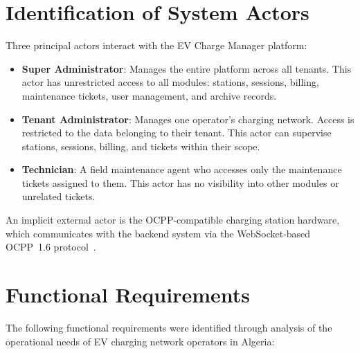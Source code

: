 \documentclass[12pt,a4paper]{report}
\begin{document}
\section{Identification of System Actors}

Three principal actors interact with the EV Charge Manager platform:

\begin{itemize}
  \item \textbf{Super Administrator}: Manages the entire platform across all tenants. This actor
        has unrestricted access to all modules: stations, sessions, billing, maintenance tickets,
        user management, and archive records.
  \item \textbf{Tenant Administrator}: Manages one operator's charging network. Access is
        restricted to the data belonging to their tenant. This actor can supervise stations,
        sessions, billing, and tickets within their scope.
  \item \textbf{Technician}: A field maintenance agent who accesses only the maintenance tickets
        assigned to them. This actor has no visibility into other modules or unrelated tickets.
\end{itemize}

An implicit external actor is the OCPP-compatible charging station hardware, which communicates
with the backend system via the WebSocket-based OCPP~1.6 protocol~\autocite{ocpp16_ed2}.

\section{Functional Requirements}

The following functional requirements were identified through analysis of the operational needs
of EV charging network operators in Algeria:
\end{document}

